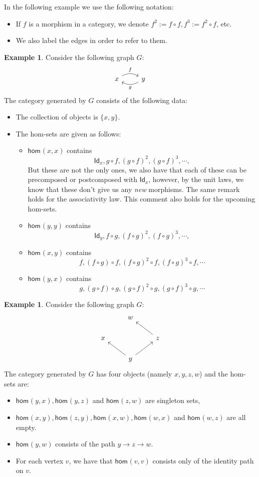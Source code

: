 \documentclass[a4paper,10pt]{scrartcl}
\theoremstyle{plain}
\theoremstyle{definition}
\newtheorem{exa}[thm]{Example}
\newcommand{\cfont}[1]{\ensuremath{\mathsf{#1}}}
\newcommand{\Hom}[3][]{\cfont{hom}_{#1}(#2,#3)}
\newcommand{\Id}[1][]{\cfont{Id}_{#1}}
\newcommand{\co}[2]{\ensuremath{#2 \circ #1}}
\begin{document}
In the following example we use the following notation: 
\begin{itemize}
\item If $f$ is a morphism in a category, we denote $f^{2} := \co{f}{f}, f^{3} := \co{f}{f^2}$, etc.
\item We also label the edges in order to refer to them.
\end{itemize}
\begin{exa}\label{exa:graph_xy_yx} Consider the following graph $G$:
\[
\begin{tikzcd}
x \arrow[r, "f", bend left] & y \arrow[l, "g", bend left]
\end{tikzcd}
\]
The category generated by $G$ consists of the following data:
\begin{itemize}
\item The collection of objects is $\{x,y\}$.
\item The hom-sets are given as follows:
\begin{itemize}
\item $\Hom{x}{x}$ contains
\[
\Id[x], \co{f}{g}, (\co{f}{g})^2, (\co{f}{g})^3, \cdots,
\]
But these are not the only ones, we also have that each of these can be precomposed or postcomposed with $\Id[x]$, however, by the unit laws, we know that these don't give us any \textit{new} morphisms. The same remark holds for the associativity law. This comment also holds for the upcoming hom-sets.
\item $\Hom{y}{y}$ contains
\[
\Id[y], \co{g}{f}, (\co{g}{f})^2, (\co{g}{f})^3, \cdots,
\]
\item $\Hom{x}{y}$ contains  
\[
f, \co{f}{(\co{g}{f})}, \co{f}{(\co{g}{f})^2}, \co{f}{(\co{g}{f})^3}, \cdots
\]
\item $\Hom{y}{x}$ contains
\[
g, \co{g}{(\co{f}{g})}, \co{g}{(\co{f}{g})^2}, \co{g}{(\co{f}{g})^3}, \cdots
\] 
\end{itemize}
\end{itemize}
\end{exa}

\begin{exa}\label{exa:graph_yx_yz_zw} Consider the following graph $G$:
\[
\begin{tikzcd}
& w & \\
x & & z \arrow[lu] \\
& y \arrow[lu] \arrow[ru] &
\end{tikzcd}
\]
The category generated by $G$ has four objects (namely $x,y,z,w$) and the hom-sets are: 
\begin{itemize}
\item $\Hom{y}{x}, \Hom{y}{z}$ and $\Hom{z}{w}$ are singleton sets, 
\item $\Hom{x}{y}, \Hom{z}{y}, \Hom{x}{w}, \Hom{w}{x}$ and $\Hom{w}{z}$ are all empty. 
\item $\Hom{y}{w}$ consists of the path $y\to z\to w$.
\item For each vertex $v$, we have that $\Hom{v}{v}$ consists only of the identity path on $v$.
\end{itemize}
\end{exa}
\end{document}
